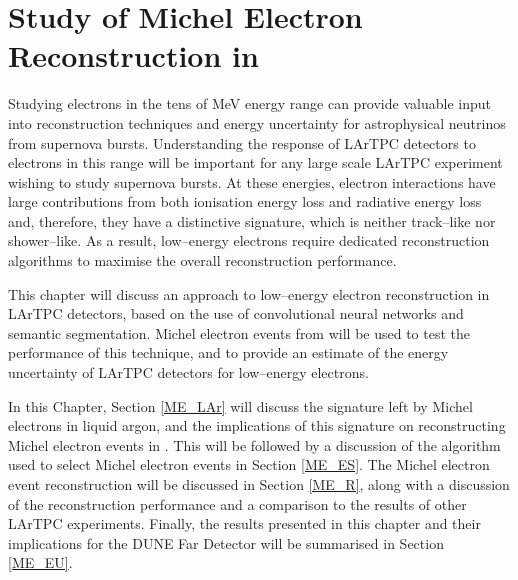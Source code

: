 \chapter{\label{ch:michel}Study of Michel Electron Reconstruction in \protodune{}}

\minitoc

\noindent
Studying electrons in the tens of MeV energy range can provide valuable input
into reconstruction techniques and energy uncertainty for astrophysical
neutrinos from supernova bursts. Understanding the response of LArTPC
detectors to electrons in this range will be important for any large scale
LArTPC experiment wishing to study supernova bursts. At these energies,
electron interactions have large contributions from both ionisation energy
loss and radiative energy loss and, therefore, they have a distinctive 
signature, which is neither track--like nor shower--like. As a result, 
low--energy electrons require dedicated reconstruction algorithms to maximise 
the overall reconstruction performance.

This chapter will discuss an approach to low--energy electron reconstruction
in LArTPC detectors, based on the use of convolutional neural networks and
semantic segmentation. Michel electron events from \protodune{} will be used
to test the performance of this technique, and to provide an estimate of the
energy uncertainty of LArTPC detectors for low--energy electrons.

In this Chapter, Section \ref{ME_LAr} will discuss the signature left by Michel
electrons in liquid argon, and the implications of this signature on
reconstructing Michel electron events in \protodune{}. This will be followed by
a discussion of the algorithm used to select Michel electron events in Section
\ref{ME_ES}. The Michel electron event reconstruction will be discussed in
Section \ref{ME_R}, along with a discussion of the reconstruction performance
and a comparison to the results of other LArTPC experiments. Finally, the
results presented in this chapter and their implications for the DUNE Far 
Detector will be summarised in Section \ref{ME_EU}.



